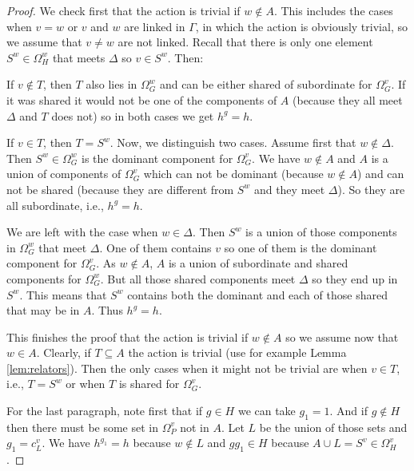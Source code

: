 \documentclass[10pt]{amsart}
\theoremstyle{definition}
\theoremstyle{definition}
\numberwithin{equation}{section}
\begin{document}
\begin{proof}  We check first that the action is trivial if $w\not\in A$. This includes the cases when $v=w$ or $v$ and $w$ are linked in $\Gamma$, in which the action is obviously trivial, so we assume that $v\neq w$ are not linked. Recall that there is only one element $S^w\in\Omega_H^w$ that meets $\Delta$ so $v\in S^w$. Then:

If $v\not\in T$, then $T$ also lies in $\Omega_G^w$ and can be either shared of subordinate for $\Omega_G^v$. If it was shared it would not be one of the components of $A$ (because they all meet $\Delta$ and $T$ does not) so in both cases we get $h^g=h$.

If $v\in T$, then $T=S^w$. Now, we distinguish two cases. Assume first that $w\not\in\Delta$. Then $S^w\in\Omega_G^w$ is the dominant component for $\Omega_G^v$. We have $w\not\in A$ and $A$ is a union of components of $\Omega_G^v$ which can not be dominant (because $w\not\in A$) and can not be shared (because they are different from $S^w$ and they meet $\Delta$). So they are all subordinate, i.e., $h^g=h$.

We are left with the case when $w\in\Delta$. Then $S^w$ is a union of those components in $\Omega^w_G$ that meet $\Delta$. One of them contains $v$ so one of them is the dominant component for $\Omega_G^v$. As $w\not\in A$, $A$ is a union of subordinate and shared components for $\Omega_G^w$. But all those shared components meet $\Delta$ so they end up in $S^w$. This means that $S^w$ contains both the dominant and each of those shared that may be in $A$. Thus $h^g=h$.

This finishes the proof that the action is trivial if $w\not\in A$ so we assume now that $w\in A$. Clearly, if $T\subseteq A$ the action is trivial (use for example Lemma \ref{lem:relators}). Then the only cases when it might not be trivial are when $v\in T$, i.e., $T=S^w$ or when $T$ is shared for $\Omega_G^v$.

For the last paragraph, note first that if $g\in H$ we can take $g_1=1$. And if $g\not\in H$ then there must be some set in $\Omega_P^v$ not in $A$. Let $L$ be the union of those sets and $g_1=c^v_L$. We have $h^{g_1}=h$ because $w\not\in L$ and $gg_1\in H$ because $A\cup L=S^v\in\Omega^v_H$.
\end{proof}
\end{document}
